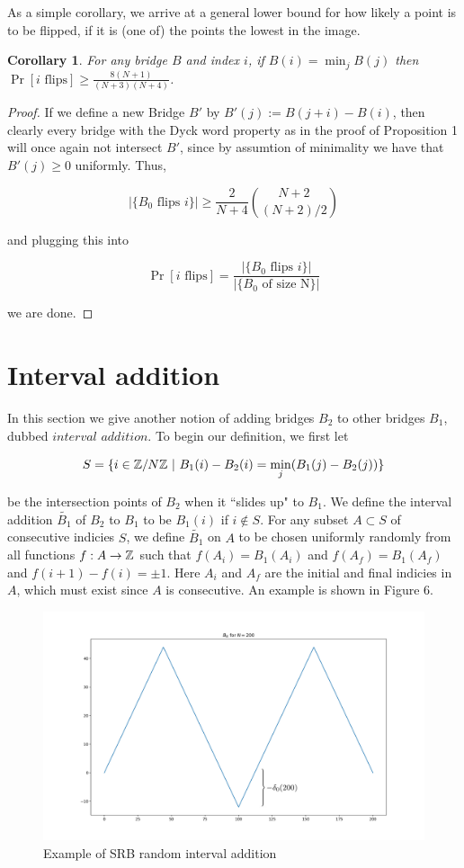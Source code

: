 \documentclass{article}
\newtheorem{corollary}{Corollary}
\theoremstyle{definition}
\begin{document}
As a simple corollary, we arrive at a general lower bound for how likely a point is to be flipped, if it is (one of) the points the lowest in the image.

\begin{corollary} For any bridge $B$ and index $i$, if $B(i)=\min_jB(j)$ then $\Pr[i \mathrm{\,\, flips}]\geq \frac{8(N+1)}{(N+3)(N+4)}$.
\end{corollary}
\begin{proof} If we define a new Bridge $B'$ by $B'(j):=B(j+i)-B(i)$, then clearly every bridge with the Dyck word property as in the proof of Proposition 1 will once again not intersect $B'$, since by assumtion of minimality we have that $B'(j)\geq0$ uniformly. Thus,

$$|\{B_0 \,\, \mathrm{flips\,\, }i\}|\geq \frac{2}{N+4}{N+2\choose (N+2)/2}$$

and plugging this into

$$\Pr[i\,\,\mathrm{flips}]=\frac{|\{B_0 \,\, \mathrm{flips\,\, }i\}|}{|\{B_0\,\,\mathrm{of\,\,size\,\,N}\}|}$$

we are done.
\end{proof}

\section{Interval addition}

In this section we give another notion of adding bridges $B_2$ to other bridges $B_1$, dubbed $\mathit{interval \,\,addition}$. To begin our definition, we first let

$$S=\{i\in \mathbb{Z}/N\mathbb{Z} \,\,|\,\, B_1(i)-B_2(i)=\min_j(B_1(j)-B_2(j))\}$$

be the intersection points of $B_2$ when it ``slides up" to $B_1$. We define the interval addition $\tilde{B_1}$ of $B_2$ to $B_1$ to be $B_1(i)$ if $i\not\in S$. For any subset $A\subset S$ of consecutive indicies $S$, we define $\tilde{B_1}$ on $A$ to be chosen uniformly randomly from all functions $f:A\to \mathbb{Z}$ such that $f(A_{i})=B_1(A_{i})$ and $f(A_{f})=B_1(A_{f})$ and $f(i+1)-f(i)=\pm1$. Here $A_i$ and $A_f$ are the initial and final indicies in $A$, which must exist since $A$ is consecutive. An example is shown in Figure 6.


\begin{figure}[h!]
\caption{Example of SRB random interval addition}
\centering
\includegraphics[width=.7\textwidth]{Figure_6}
\end{figure}
\end{document}
